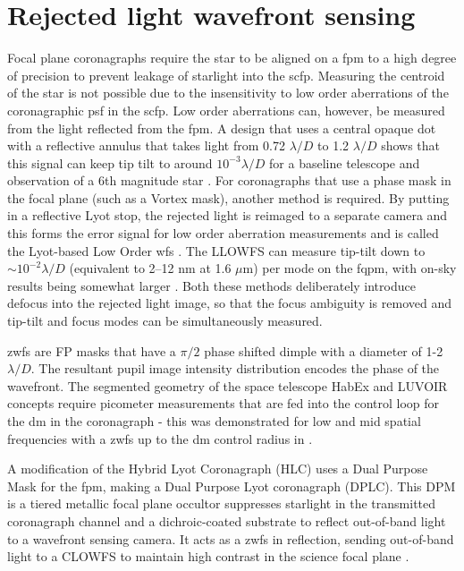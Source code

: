 \documentclass[letterpaper]{ar-1col}
\newcommand{\mum}{$\mu$m}
\newcommand{\ld}{$\lambda/D$}
\begin{document}
\section{Rejected light wavefront sensing} 

Focal plane coronagraphs require the star to be aligned on a \ac{fpm} to a high degree of precision to prevent leakage of starlight into the \ac{scfp}.
%
Measuring the centroid of the star is not possible due to the insensitivity to low order aberrations of the coronagraphic \ac{psf} in the \ac{scfp}.
%
Low order aberrations can, however, be measured from the light reflected from the \ac{fpm}.
%
A design that uses a central opaque dot with a reflective annulus that takes light from 0.72 \ld{} to 1.2 \ld{} shows that this signal can keep tip tilt to around $10^{-3}$\ld{} for a baseline telescope and observation of a 6th magnitude star \citep[Coronagraphic low order \ac{wfs}; CLOWFS ][]{Guyon09}.
%
For coronagraphs that use a phase mask in the focal plane (such as a Vortex mask), another method is required.
%
By putting in a reflective Lyot stop, the rejected light is reimaged to a separate camera and this forms the error signal for low order aberration measurements and is called the Lyot-based Low Order \ac{wfs} \citep[LLOWFS; ][]{Singh14,Singh15}.
%
The LLOWFS can measure tip-tilt down to $\sim 10^{-2}$\ld{} (equivalent to 2–12 nm at 1.6 \mum{}) per mode on the \ac{fqpm}, with on-sky results being somewhat larger \citep{Singh15}.
%
Both these methods deliberately introduce defocus into the rejected light image, so that the focus ambiguity is removed and tip-tilt and focus modes can be simultaneously measured.

\ac{zwfs} are FP masks that have a $\pi/2$ phase shifted dimple with a diameter of 1-2\ld{}.
%
The resultant pupil image intensity distribution encodes the phase of the wavefront.
%
The segmented geometry of the space telescope HabEx and LUVOIR concepts require picometer measurements that are fed into the control loop for the \ac{dm} in the coronagraph - this was demonstrated for low and mid spatial frequencies with a \ac{zwfs} up to the \ac{dm} control radius in \citet{Ruane20}.


A modification of the Hybrid Lyot Coronagraph (HLC) uses a Dual Purpose Mask for the \ac{fpm}, making a Dual Purpose Lyot coronagraph (DPLC).
%
This DPM is a tiered metallic focal plane occultor suppresses starlight in the transmitted coronagraph channel and a dichroic-coated substrate to reflect out-of-band light to a wavefront sensing camera.
%
It acts as a \ac{zwfs} in reflection, sending out-of-band light to a CLOWFS to maintain high contrast in the science focal plane \citep{Ruane23}.
\end{document}
